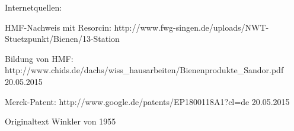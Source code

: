 Internetquellen:

HMF-Nachweis mit Resorcin:
http://www.fwg-singen.de/uploads/NWT-Stuetzpunkt/Bienen/13-Station%

Bildung von HMF:
http://www.chids.de/dachs/wiss_hausarbeiten/Bienenprodukte_Sandor.pdf 20.05.2015

Merck-Patent:
http://www.google.de/patents/EP1800118A1?cl=de 20.05.2015

Originaltext Winkler von 1955






